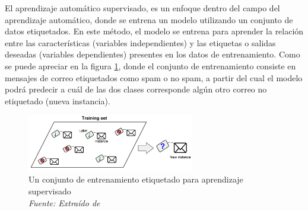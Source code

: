 El aprendizaje automático supervisado, es un enfoque dentro del campo del aprendizaje automático, donde se entrena un modelo utilizando un conjunto de datos etiquetados. En este método, el modelo se entrena para aprender la relación entre las características (variables independientes) y las etiquetas o salidas deseadas (variables dependientes) presentes en los datos de entrenamiento. Como se puede apreciar en la figura \ref{fig:an8}, donde el conjunto de entrenamiento consiste en mensajes de correo etiquetados como spam o no spam, a partir del cual el modelo podrá predecir a cuál de las dos clases corresponde algún otro correo no etiquetado (nueva instancia). 

\begin{figure}[h!]
	\includegraphics[width=0.65\textwidth]{capitulo2/figuras/an8.png}
	\caption[Un conjunto de entrenamiento etiquetado para aprendizaje supervisado]{Un conjunto de entrenamiento etiquetado para aprendizaje supervisado
		\\\textit{Fuente: Extraído de} \protect\cite[p. 8]{geron2019hands} }
	\label{fig:an8}
\end{figure}